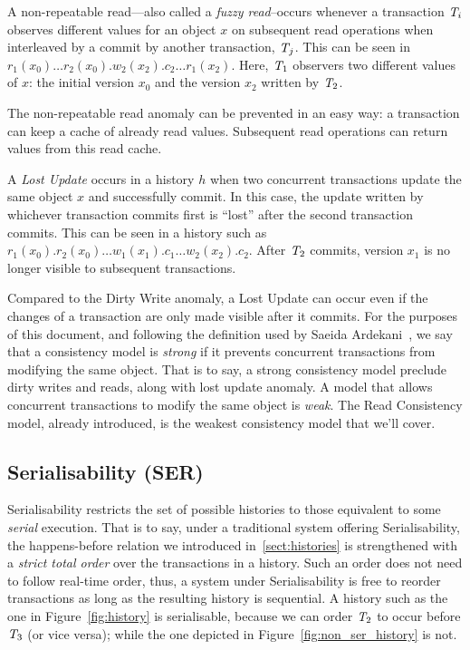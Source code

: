 \begin{definition}
A non-repeatable read---also called a \emph{fuzzy read}--occurs whenever a transaction $\mathit{T}_i$ observes different values for an object $x$ on subsequent read operations when interleaved by a commit by another transaction, $\mathit{T}_j$. This can be seen in $r_1(x_0)\ldots r_2(x_0).w_2(x_2).c_2 \ldots r_1(x_2)$. Here, $\mathit{T}_1$ observers two different values of $x$: the initial version $x_0$ and the version $x_2$ written by $\mathit{T}_2$.
\end{definition}

The non-repeatable read anomaly can be prevented in an easy way: a transaction can keep a cache of already read values. Subsequent read operations can return values from this read cache.

\begin{definition}
A \emph{Lost Update} occurs in a history $h$ when two concurrent transactions update the same object $x$ and successfully commit. In this case, the update written by whichever transaction commits first is ``lost'' after the second transaction commits. This can be seen in a history such as $r_1(x_0).r_2(x_0) \ldots w_1(x_1).c_1\ldots w_2(x_2).c_2$. After $\mathit{T}_2$ commits, version $x_1$ is no longer visible to subsequent transactions.
\end{definition}

Compared to the Dirty Write anomaly, a Lost Update can occur even if the changes of a transaction are only made visible after it commits. For the purposes of this document, and following the definition used by Saeida Ardekani~\citep{ardekani_thesis}, we say that a consistency model is \emph{strong} if it prevents concurrent transactions from modifying the same object. That is to say, a strong consistency model preclude dirty writes and reads, along with lost update anomaly. A model that allows concurrent transactions to modify the same object is \emph{weak}. The Read Consistency model, already introduced, is the weakest consistency model that we'll cover.

\subsection{Serialisability (SER)}
\label{sect:ser}

Serialisability restricts the set of possible histories to those equivalent to some \emph{serial} execution. That is to say, under a traditional system offering Serialisability, the happens-before relation we introduced in~\ref{sect:histories} is strengthened with a \emph{strict total order} over the transactions in a history. Such an order does not need to follow real-time order, thus, a system under Serialisability is free to reorder transactions as long as the resulting history is sequential. A history such as the one in Figure~\ref{fig:history} is serialisable, because we can order $\mathit{T}_2$ to occur before $\mathit{T}_3$ (or vice versa); while the one depicted in Figure~\ref{fig:non_ser_history} is not.

